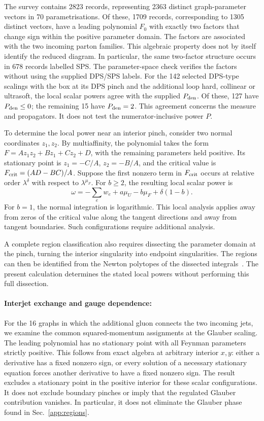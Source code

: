 The survey contains 2823 records,
representing 2363 distinct
graph-parameter vectors in
70 parametrisations.
Of these, 1709 records, corresponding
to 1305 distinct vectors, have
a leading polynomial $F_0$ with
exactly two factors that change
sign within the positive parameter
domain. The factors are associated
with the two incoming parton families.
%
This algebraic property does not
by itself identify the reduced
diagram. In particular, the same
two-factor structure occurs in
678 records labelled SPS.
The parameter-space check verifies
the factors without using the
supplied DPS/SPS labels.
%
For the 142 selected DPS-type
scalings with the box at its
DPS pinch and the additional
loop hard, collinear or ultrasoft,
the local scalar powers agree
with the supplied $P_{\rm den}$.
Of these, 127 have
$P_{\rm den}\le0$; the remaining
15 have $P_{\rm den}=2$.
This agreement concerns the
measure and propagators.
It does not test the
numerator-inclusive power $P$.

To determine the local power
near an interior pinch, consider
two normal coordinates $z_1,z_2$.
By multiaffinity, the polynomial
takes the form
$F=Az_1z_2+Bz_1+Cz_2+D$,
with the remaining parameters
held positive.
Its stationary point is
$z_1=-C/A$, $z_2=-B/A$,
and the critical value is
$F_{\rm crit}=(AD-BC)/A$.
%
Suppose the first nonzero term
in $F_{\rm crit}$ occurs at
relative order $\lambda^\delta$
with respect to $\lambda^{\mu_F}$.
For $b\ge2$, the resulting
local scalar power is
\begin{equation}
\omega=-\sum_e w_e+a\mu_U-b\mu_F+\delta(1-b).
\label{eq:pinchlocalpower}
\end{equation}
For $b=1$, the normal integration
is logarithmic.
%
This local analysis applies away
from zeros of the critical value
along the tangent directions and
away from tangent boundaries.
Such configurations require
additional analysis.

A complete region classification
also requires dissecting the
parameter domain at the pinch,
turning the interior singularity
into endpoint singularities.
The regions can then be identified
from the Newton polytopes of
the dissected integrals~\cite{Gardi:2024dissecting}.
The present calculation determines
the stated local powers without
performing this full dissection.

\paragraph{Interjet exchange and gauge dependence: }
For the 16 graphs in which the
additional gluon connects the two
incoming jets, we examine the
common squared-momentum assignments
at the Glauber scaling.
The leading polynomial has no
stationary point with all Feynman
parameters strictly positive.
%
This follows from exact algebra
at arbitrary interior $x,y$:
either a derivative has a fixed
nonzero sign, or every solution
of a necessary stationary equation
forces another derivative to have
a fixed nonzero sign.
%
The result excludes a stationary
point in the positive interior
for these scalar configurations.
It does not exclude boundary
pinches or imply that the regulated
Glauber contribution vanishes.
In particular, it does not
eliminate the Glauber phase
found in Sec.~\ref{app:regions}.

